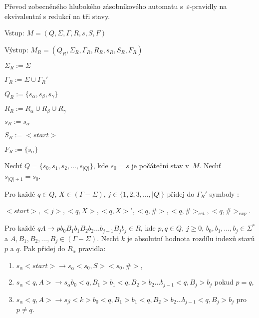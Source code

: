 \begin{Alg}\label{alg_gen_deep_pda_state}
Převod zobecněného hlubokého zásobníkového automatu s~$\varepsilon$-pravidly na ekvivalentní s redukcí na tři stavy.

\begin{list}{}{\setlength\parsep{0cm} \setlength\itemsep{0cm} \setlength\leftmargin{1em}}
   \item Vstup: $M = (Q,\Sigma,\Gamma, R, s, S, F)$ 
   \item Výstup: $M_{R} = (Q_{R}, \Sigma_{R}, {\Gamma}_{R}, R_{R}, s_{R},  S_{R}, F_{R})$ \medskip

   \item ${\Sigma}_{R} := \Sigma$
   \item ${\Gamma}_{R} := \Sigma \cup {\Gamma}_{R}'$
   \item $Q_{R} := \{s_\alpha, s_\beta, s_\gamma \}$
   \item $R_{R} := R_{\alpha} \cup R_{\beta} \cup R_{\gamma}$
   \item $s_{R} := s_{\alpha} $
   \item $S_{R} := <start> $
   \item $F_{R} := \{s_{\alpha}\} $ \medskip

   \item Nechť $Q = \{s_0, s_1, s_2, \dots,s_{|Q|}\}$, kde $s_0 = s$ je počáteční stav v~$M$. Nechť $s_{|Q|+1} = s_0$.\medskip

   \item Pro každé $q \in Q$, $X \in (\Gamma - \Sigma)$, $j \in \{1,2,3,\dots,|Q|\}$ přidej do ${\Gamma}_{R}'$ symboly :
   \item $<start>, <j>, <q, X>, <q, X>', <q, \#>, <q, \#>_{set}, <q, \#>_{exp}$.\medskip

   \item Pro každé $qA \rightarrow p b_0 B_1 b_1 B_2 b_2 \dots b_{j-1} B_{j} b_j \in R$, kde $p, q \in Q$, $j \ge 0$, $b_0,b_1,\dots,b_j \in {\Sigma}^*$ a $A, B_1,B_2,\dots,B_j \in (\Gamma - \Sigma)$. 
         Nechť $k$ je absolutní hodnota rozdílu indexů stavů $p$ a $q$. 
         Pak přidej do $R_\alpha$ pravidla:

\begin{enumerate}
\renewcommand{\labelenumi}{(\roman{enumi})}

   \item $s_\alpha <start> \rightarrow s_\alpha <s_0, S> <s_0, \#>$,
   \item  $s_\alpha <q, A> \rightarrow s_\alpha b_0 <q, B_1> b_1 <q, B_2> b_2 \dots b_{j-1} <q, B_j> b_j$ pokud $p = q$,
   \item  $s_\alpha <q, A> \rightarrow s_\beta <k> b_0 <q, B_1> b_1 <q, B_2> b_2 \dots b_{j-1} <q, B_j> b_j$ pro $p \ne q$. 


\end{enumerate}
\end{list}
\end{Alg}
